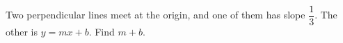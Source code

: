 Two perpendicular lines meet at the origin, and one of them has slope $\dfrac13$. The other is $y=mx+b$. Find $m+b$.
